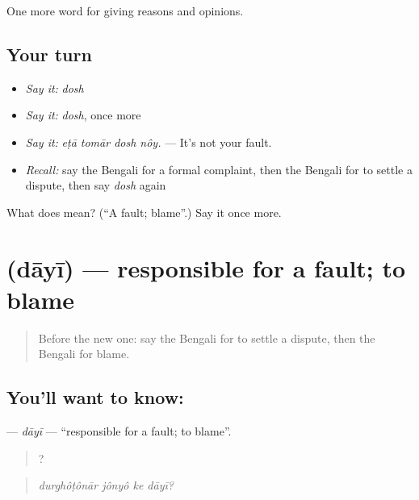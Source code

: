 \begin{grammarlens}[title={What you've built}]
One more word for giving reasons and opinions.
\end{grammarlens}

\subsection*{Your turn}
\begin{itemize}
\raggedright
  \item \emph{Say it:} \emph{dosh}
  \item \emph{Say it:} \emph{dosh}, once more
  \item \emph{Say it:} \emph{eṭā tomār dosh nôy.} — It's not your fault.
  \item \emph{Recall:} say the Bengali for a formal complaint, then the Bengali for to settle a dispute, then say \emph{dosh} again
\end{itemize}

\begin{tcolorbox}[breakable,colback=teal!4,colframe=teal!35!black,title={Before you move on}]
What does  mean? (\textquotedblleft{}A fault; blame\textquotedblright{}.) Say it once more.
\end{tcolorbox}
\section[\texorpdfstring{\bn{দায়ী} (dāyī)}{দায়ী (dāyī)}]{ (dāyī) — responsible for a fault; to blame}

\label{lesson:BN-C343-dayi}



\begin{quote}
Before the new one: say the Bengali for to settle a dispute, then the Bengali for blame.
\end{quote}

\subsection*{You'll want to know: }
\textbf{} — \emph{dāyī} — \textquotedblleft{}responsible for a fault; to blame\textquotedblright{}.

\begin{quote}
   ?
\end{quote}

\begin{quote}
\emph{durghôṭônār jônyô ke dāyī?}
\end{quote}

